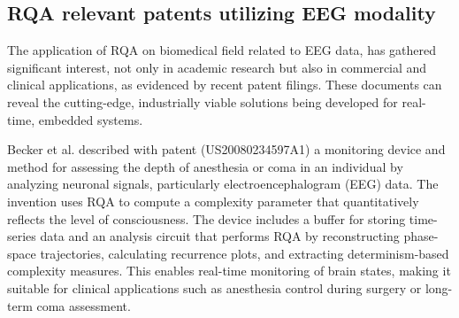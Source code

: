 \documentclass{article}
\begin{document}
				
			\subsection{RQA relevant patents utilizing EEG modality}
			\label{sec:rqa-patents}

			The application of RQA on biomedical field related to EEG data, 
			has gathered significant interest, 
			not only in academic research but also in commercial and clinical applications, 
			as evidenced by recent patent filings. 
			These documents can reveal the cutting-edge, industrially viable solutions 
			being developed for real-time, embedded systems. 

				
			Becker et al.\cite{patcoma} described with patent (US20080234597A1) 
			a monitoring device and method for assessing the 
			depth of anesthesia or coma in an individual by 
			analyzing neuronal signals, particularly electroencephalogram (EEG) data. 
			The invention uses RQA 
			to compute a complexity parameter that 
			quantitatively reflects the level of consciousness. 
			The device includes a buffer for storing time-series data 
			and an analysis circuit that performs RQA by reconstructing 
			phase-space trajectories, calculating recurrence plots, 
			and extracting determinism-based complexity measures. 
			This enables real-time monitoring of brain states, 
			making it suitable for clinical applications such as 
			anesthesia control during surgery or long-term coma assessment.
\end{document}
